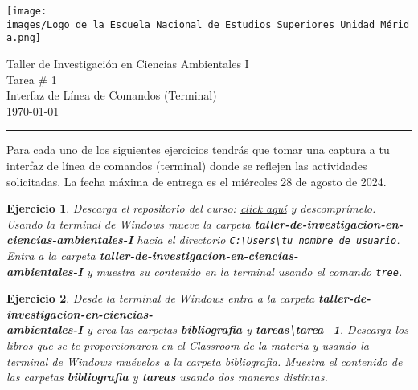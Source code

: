 \documentclass[12pt,letterpaper]{article}
\newtheorem{exercise}{Ejercicio}
\begin{document}
\begin{minipage}[c]{4.8cm}
	\vspace{6mm}
	\texttt{[image: images/Logo\_de\_la\_Escuela\_Nacional\_de\_Estudios\_Superiores\_Unidad\_Mérida.png]}
\end{minipage}
\begin{minipage}[c]{12cm}
	\vspace{6mm}
	\center
	\huge{Taller de Investigación en Ciencias Ambientales I} \\ \bigskip
	\Large{Tarea \# 1} \\
	\large{Interfaz de Línea de Comandos (Terminal)}\\ \bigskip
	\today
\end{minipage}
\vspace{3mm}
\hrule
\vspace{3mm}
Para cada uno de los siguientes ejercicios tendrás que tomar una captura a tu interfaz de línea de comandos (terminal) donde se reflejen las actividades solicitadas. La fecha máxima de entrega es el miércoles 28 de agosto de 2024. 
\begin{exercise}
Descarga el repositorio del curso: \href{https://github.com/ENES-Merida/taller-de-investigacion-en-ciencias-ambientales-I/archive/refs/heads/main.zip}{click aquí} y descomprímelo. Usando la terminal de Windows mueve la carpeta \textbf{taller-de-investigacion-en-ciencias-ambientales-I} hacia el directorio \verb|C:\Users\tu_nombre_de_usuario|. Entra a la carpeta \textbf{taller-de-investigacion-en-ciencias-\\ambientales-I} y muestra su contenido en la terminal usando el comando \verb|tree|.
\end{exercise}
\begin{exercise}
Desde la terminal de Windows entra a la carpeta \textbf{taller-de-investigacion-en-ciencias-\\ambientales-I} y crea las carpetas \textbf{bibliografia} y \textbf{tareas\textbackslash tarea\_1}. Descarga los libros que se te proporcionaron en el Classroom de la materia y usando la terminal de Windows muévelos a la carpeta bibliografia. Muestra el contenido de las carpetas \textbf{bibliografia} y \textbf{tareas} usando dos maneras distintas.
\end{exercise}
\end{document}
